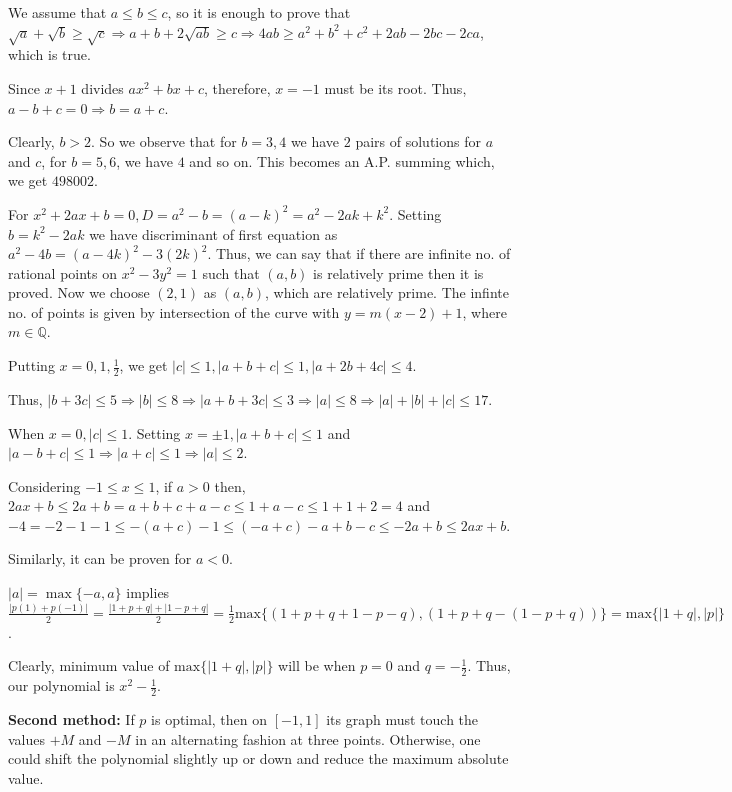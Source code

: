   We assume that $a\leq b\leq c$, so it is enough to prove that $\sqrt{a} + \sqrt{b} \geq
  \sqrt{c}\Rightarrow a + b + 2\sqrt{ab}\geq c \Rightarrow 4ab\geq a^2 + b^2 + c^2 + 2ab - 2bc - 2ca$, which
  is true.
\item Since $x + 1$ divides $ax^2 + bx + c$, therefore, $x = -1$ must be its root. Thus, $a - b + c = 0
  \Rightarrow b = a + c$.

  Clearly, $b > 2$. So we observe that for $b = 3, 4$ we have $2$ pairs of solutions for $a$ and $c$, for $b
  = 5, 6$, we have $4$ and so on. This becomes an A.P. summing which, we get $498002$.
\item For $x^2 + 2ax + b = 0, D = a^2 - b = (a - k)^2 = a^2 - 2ak + k^2$. Setting $b = k^2 - 2ak$ we have
  discriminant of first equation as $a^2 - 4b = (a - 4k)^2 - 3(2k)^2$. Thus, we can say that if there are
  infinite no. of rational points on $x^2 - 3y^2 = 1$ such that $(a, b)$ is relatively prime then it is
  proved. Now we choose $(2, 1)$ as $(a, b)$, which are relatively prime. The infinte no. of points is given
  by intersection of the curve with $y = m(x - 2) + 1$, where $m\in\mathbb{Q}$.
\item Putting $x = 0, 1, \frac{1}{2}$, we get $|c|\leq 1, |a + b + c|\leq 1, |a + 2b + 4c|\leq 4$.

  Thus, $|b + 3c|\leq 5 \Rightarrow |b|\leq 8 \Rightarrow |a + b + 3c|\leq 3\Rightarrow |a|\leq 8
  \Rightarrow |a| + |b| + |c|\leq 17$.
\item When $x = 0, |c|\leq 1$. Setting $x = \pm 1, |a + b + c|\leq 1$ and $|a - b + c|\leq 1\Rightarrow |a +
  c|\leq 1\Rightarrow |a|\leq 2$.

  Considering $-1\leq x\leq 1$, if $a > 0$ then, $2ax + b \leq 2a + b = a + b + c + a - c\leq 1 + a - c\leq
  1 + 1 + 2 = 4$ and $-4 = -2 - 1 - 1\leq -(a + c) - 1\leq (-a + c) - a + b - c\leq -2a + b\leq 2ax + b$.

  Similarly, it can be proven for $a < 0$.
\item $|a| = \max\{-a, a\}$ implies $\frac{|p(1) + p(-1)|}{2} = \frac{|1 + p + q| + |1 - p + q|}{2} =
  \frac{1}{2}\mathrm{max}\{(1 + p + q + 1 - p - q), (1 + p + q - (1 - p + q))\} = \mathrm{max}\{|1 + q|, |p|\}$.

  Clearly, minimum value of $\mathrm{max}\{|1 + q|, |p|\}$ will be when $p = 0$ and $q = -\frac{1}{2}$. Thus, our
  polynomial is $x^2 - \frac{1}{2}$.

  {\bf Second method:} If $p$ is optimal, then on $[−1, 1]$ its graph must touch the values $+M$ and $−M$ in
  an alternating fashion at three points. Otherwise, one could shift the polynomial slightly up or down and
  reduce the maximum absolute value.

